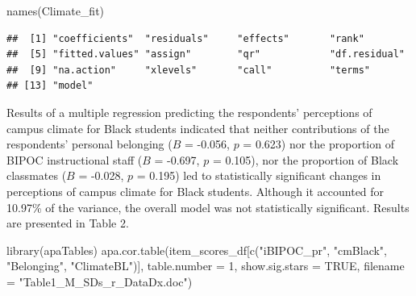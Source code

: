 \documentclass[
  11pt,
]{book}
\newenvironment{Shaded}{\begin{snugshade}}{\end{snugshade}}
\newcommand{\AttributeTok}[1]{\textcolor[rgb]{0.77,0.63,0.00}{#1}}
\newcommand{\ConstantTok}[1]{\textcolor[rgb]{0.00,0.00,0.00}{#1}}
\newcommand{\DecValTok}[1]{\textcolor[rgb]{0.00,0.00,0.81}{#1}}
\newcommand{\FunctionTok}[1]{\textcolor[rgb]{0.00,0.00,0.00}{#1}}
\newcommand{\NormalTok}[1]{#1}
\newcommand{\StringTok}[1]{\textcolor[rgb]{0.31,0.60,0.02}{#1}}
\begin{document}
\begin{Shaded}
\begin{Highlighting}[]
\FunctionTok{names}\NormalTok{(Climate\_fit)}
\end{Highlighting}
\end{Shaded}

\begin{verbatim}
##  [1] "coefficients"  "residuals"     "effects"       "rank"         
##  [5] "fitted.values" "assign"        "qr"            "df.residual"  
##  [9] "na.action"     "xlevels"       "call"          "terms"        
## [13] "model"
\end{verbatim}

Results of a multiple regression predicting the respondents' perceptions of campus climate for Black students indicated that neither contributions of the respondents' personal belonging (\(B\) = -0.056, \(p\) = 0.623) nor the proportion of BIPOC instructional staff (\(B\) = -0.697, \(p\) = 0.105), nor the proportion of Black classmates (\(B\) = -0.028, \(p\) = 0.195) led to statistically significant changes in perceptions of campus climate for Black students. Although it accounted for 10.97\% of the variance, the overall model was not statistically significant. Results are presented in Table 2.

\begin{Shaded}
\begin{Highlighting}[]
\FunctionTok{library}\NormalTok{(apaTables)}
\FunctionTok{apa.cor.table}\NormalTok{(item\_scores\_df[}\FunctionTok{c}\NormalTok{(}\StringTok{"iBIPOC\_pr"}\NormalTok{, }\StringTok{"cmBlack"}\NormalTok{, }\StringTok{"Belonging"}\NormalTok{, }\StringTok{"ClimateBL"}\NormalTok{)], }\AttributeTok{table.number =} \DecValTok{1}\NormalTok{, }\AttributeTok{show.sig.stars =} \ConstantTok{TRUE}\NormalTok{, }\AttributeTok{filename =} \StringTok{"Table1\_M\_SDs\_r\_DataDx.doc"}\NormalTok{)}
\end{Highlighting}
\end{Shaded}
\end{document}
